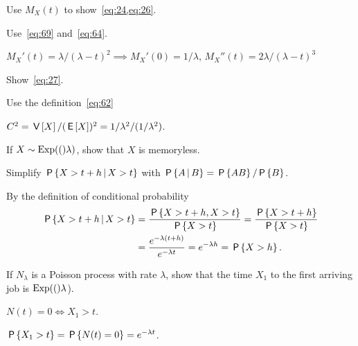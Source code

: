 \begin{exercise}\label{ex:21}
Use $M_X(t)$ to show~\cref{eq:24,eq:26}.
\begin{hint}
Use~\cref{eq:69} and~\cref{eq:64}.
\end{hint}
\begin{solution}
 $ M_X'(t)=\lambda/(\lambda-t)^2 \implies M_X'(0)=1/\lambda$, $M_X''(t)=2\lambda/(\lambda-t)^3$ %
\end{solution}
\end{exercise}


\begin{exercise}\label{ex:29}
Show~\cref{eq:27}.
\begin{hint}
 Use the definition~\cref{eq:62}
\end{hint}
\begin{solution}
 $C^2= \V X/(\E X)^2 = 1/\lambda^2/(1/\lambda^2)$.
\end{solution}
\end{exercise}

\begin{exercise}\label{ex:l-214}
If $X\sim \Exp(\lambda)$, show that $X$ is memoryless.
\begin{hint}
Simplify $\P{X>t+h\given X>t}$ with $\P{A\given B} = \P{AB}/\P{B}$.
\end{hint}
\begin{solution}
By the definition of conditional probability
\begin{equation*}
  \begin{split}
 \P{X>t+h\given X>t} &= \frac{\P{X>t+h, X>t}}{\P{X>t}} = \frac{\P{X>t+h}}{\P{X>t}} \\
&= \frac{e^{-\lambda(t+h)}}{e^{-\lambda t}} = e^{-\lambda h} = \P{X>h}.
  \end{split}
\end{equation*}
\end{solution}
\end{exercise}

\begin{exercise}\label{ex:l-212}
 If  $N_\lambda$ is a Poisson process with rate $\lambda$, show that the time $X_1$ to the first arriving job is $\Exp(\lambda$).
\begin{hint}
$N(t)= 0 \iff X_1 > t$.
\end{hint}
\begin{solution}
$\P{X_1> t} = \P{N(t) = 0} = e^{-\lambda t}$.
\end{solution}
\end{exercise}


